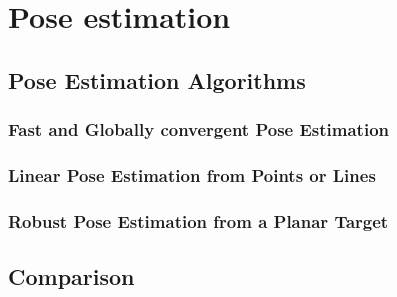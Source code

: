 \chapter{Pose estimation}\label{sect:pose}

\section{Pose Estimation Algorithms}

\subsection{Fast and Globally convergent Pose Estimation}

\subsection{Linear Pose Estimation from Points or Lines}

\subsection{Robust Pose Estimation from a Planar Target}

\section{Comparison}

